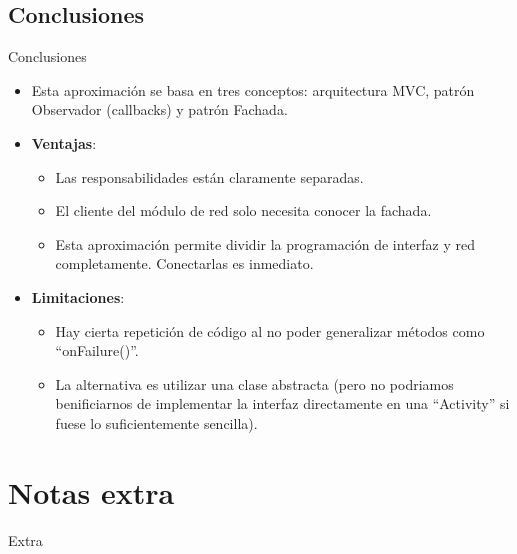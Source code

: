 \documentclass{beamer}
\begin{document}
\subsection{Conclusiones}
\begin{frame}[fragile]{Conclusiones}
\begin{itemize}
\item Esta aproximación se basa en tres conceptos: arquitectura MVC, patrón Observador (callbacks) y patrón Fachada.
\item {\bf Ventajas}:
\begin{itemize}

\item Las responsabilidades están claramente separadas.
\item El cliente del módulo de red solo necesita conocer la fachada.
\item Esta aproximación permite dividir la programación de interfaz y red completamente. Conectarlas es inmediato.
\end{itemize}

\item {\bf Limitaciones}: 
\begin{itemize}
\item Hay cierta repetición de código al no poder generalizar métodos como ``onFailure()''. \item La alternativa es utilizar una clase abstracta (pero no podriamos benificiarnos de implementar la interfaz directamente en una ``Activity'' si fuese lo suficientemente sencilla).
\end{itemize}
\end{itemize}
\end{frame}
\section{Notas extra}
\begin{frame}{Extra}
\end{frame}
\end{document}
